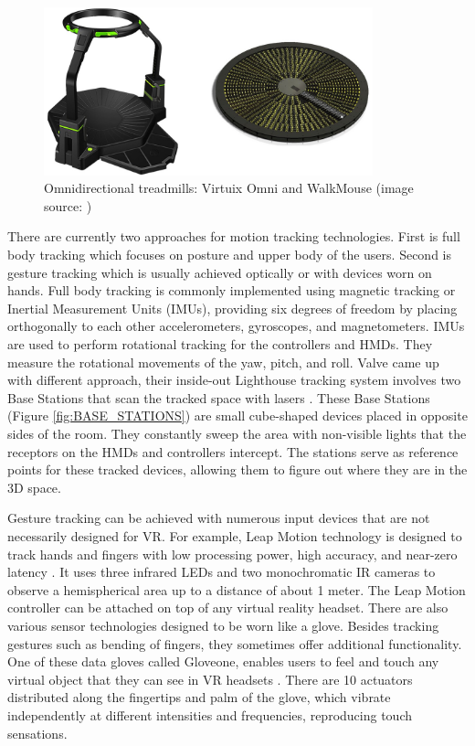 \begin{figure}[th]
\centering
\includegraphics[width=0.85\textwidth]{img/vr_threadmills.png}
\caption{Omnidirectional treadmills: Virtuix Omni and WalkMouse (image source: \cite{VR_TECHNOLOGY})}
\label{fig:VIRTUX_IMAGE}
\end{figure}

There are currently two approaches for motion tracking technologies. First is full body tracking which focuses on posture and upper body of the users. Second is gesture tracking which is usually achieved optically or with devices worn on hands. Full body tracking is commonly implemented using magnetic tracking or Inertial Measurement Units (IMUs), providing six degrees of freedom by placing orthogonally to each other accelerometers, gyroscopes, and magnetometers. IMUs are used to perform rotational tracking for the controllers and HMDs. They measure the rotational movements of the yaw, pitch, and roll. Valve came up with different approach, their inside-out Lighthouse tracking system involves two Base Stations that scan the tracked space with lasers \cite{VIVE}. These Base Stations (Figure \ref{fig:BASE_STATIONS}) are small cube-shaped devices placed in opposite sides of the room. They constantly sweep the area with non-visible lights that the receptors on the HMDs and controllers intercept. The stations serve as reference points for these tracked devices, allowing them to figure out where they are in the 3D space. 

Gesture tracking can be achieved with numerous input devices that are not necessarily designed for VR. For example, Leap Motion technology is designed to track hands and fingers with low processing power, high accuracy, and near-zero latency \cite{LEAP_MOTION}. It uses three infrared LEDs and two monochromatic IR cameras to observe a hemispherical area up to a distance of about 1 meter.  The Leap Motion controller can be attached on top of any virtual reality headset. There are also various sensor technologies designed to be worn like a glove. Besides tracking gestures such as bending of fingers, they sometimes offer additional functionality. One of these data gloves called Gloveone, enables users to feel and touch any virtual object that they can see in VR headsets \cite{GLOVEONE}. There are 10 actuators distributed along the fingertips and palm of the glove, which vibrate independently at different intensities and frequencies, reproducing touch sensations.

